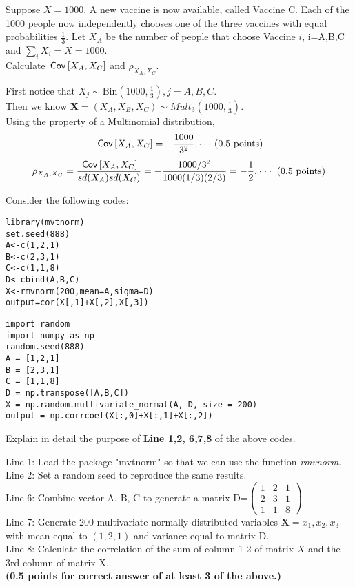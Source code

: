 \begin{exercise}[2]
Suppose $X=1000.$ A new vaccine is now available, called Vaccine C. Each of the 1000 people now independently chooses one of the three vaccines with equal probabilities $\frac{1}{3}.$  Let $X_A$ be the number of people that choose Vaccine $i$, i=A,B,C and $\sum_{i}X_i=X=1000$. \\
Calculate $\,\mathsf{Cov}\left[X_A,X_C\right]$ and $\rho_{X_A,X_C}.$
\begin{solution}
First notice that $X_j \sim \text{Bin}(1000,\frac{1}{3}), j=A, B, C.$ \\
Then we know $\boldsymbol{X}=(X_A,X_B,X_C) \sim Mult_3(1000,\frac{1}{3}).$  \\
Using the property of a Multinomial distribution,
\begin{align*}
    \,\mathsf{Cov}\left[X_A,X_C\right]=-\frac{1000}{3^2},  \cdot \cdot \cdot \text{ (0.5 points)}
\end{align*}
\begin{align*}
       \rho_{X_A,X_C}=\frac{ \,\mathsf{Cov}\left[X_A,X_C\right]}{sd(X_A)sd(X_C)}=-\frac{1000/3^2}{1000(1/3)(2/3)}=-\frac{1}{2}.  \cdot \cdot \cdot \text{ (0.5 points)}
\end{align*}
\end{solution}
\end{exercise}

\noindent Consider the following codes:
\begin{verbatim}
library(mvtnorm)
set.seed(888)
A<-c(1,2,1)
B<-c(2,3,1)
C<-c(1,1,8)
D<-cbind(A,B,C)
X<-rmvnorm(200,mean=A,sigma=D)
output=cor(X[,1]+X[,2],X[,3])
\end{verbatim}

\begin{verbatim}
import random
import numpy as np
random.seed(888)
A = [1,2,1]
B = [2,3,1]
C = [1,1,8]
D = np.transpose([A,B,C])
X = np.random.multivariate_normal(A, D, size = 200)
output = np.corrcoef(X[:,0]+X[:,1]+X[:,2])
\end{verbatim}


\begin{exercise}[1]
Explain in detail the purpose of \textbf{Line 1,2, 6,7,8} of the above codes.
\begin{solution}
Line 1: Load the package "mvtnorm" so that we can use the function \textit{rmvnorm}.\\
Line 2: Set a random seed to reproduce the same results.\\
Line 6: Combine vector A, B, C to generate a matrix D=$\begin{pmatrix}1&2&1\\2&3&1\\1&1&8\end{pmatrix}$\\
Line 7: Generate 200 multivariate normally distributed variables $\textbf{X}={x_1,x_2,x_3}$ with mean equal to $(1,2,1)$ and variance equal to matrix D.\\
Line 8: Calculate the correlation of the sum of column 1-2 of matrix $X$ and the 3rd column of matrix X.\\
\textbf{(0.5 points for correct answer of at least 3 of the above.)}
\end{solution}
\end{exercise}
